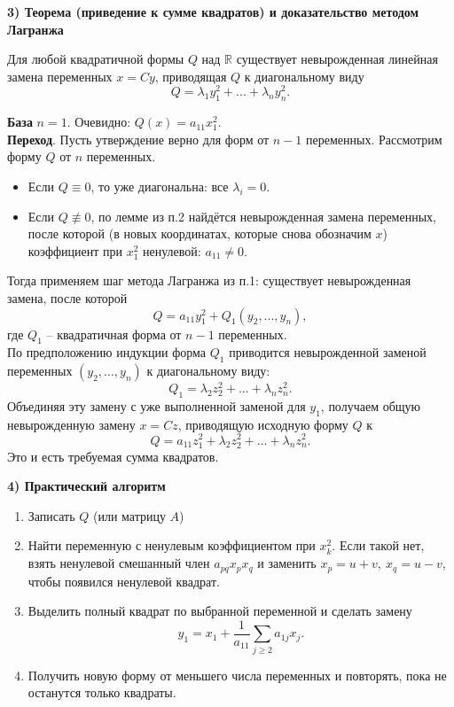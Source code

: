 \documentclass[14pt]{extreport}
\begin{document}
\begin{prbox}
        \textbf{3) Теорема (приведение к сумме квадратов) и доказательство методом Лагранжа}
        \begin{thbox}
            Для любой квадратичной формы $Q$ над $\mathbb{R}$ существует невырожденная линейная замена переменных $x=Cy$, приводящая $Q$ к диагональному виду
            \[
            Q = \lambda_1y_1^2 + ... + \lambda_ny_n^2.
            \]
        \end{thbox}
        \begin{prbox}
            \textbf{База} $n=1$. Очевидно: $Q(x) = a_{11}x_1^2$.\\
            \textbf{Переход}. Пусть утверждение верно для форм от $n-1$ переменных. Рассмотрим форму $Q$ от $n$ переменных.
            \begin{itemize}
                \item Если $Q \equiv 0$, то уже диагональна: все $\lambda_i = 0$.
                \item Если $Q \not\equiv 0$, по лемме из п.2 найдётся невырожденная замена переменных, после которой (в новых координатах, которые снова обозначим $x$) коэффициент при $x_1^2$ ненулевой: $a_{11} \neq 0$.
            \end{itemize}
            Тогда применяем шаг метода Лагранжа из п.1: существует невырожденная замена, после которой
            \[
            Q = a_{11}y_1^2 + Q_1(y_2,...,y_n),
            \]
            где $Q_1$ – квадратичная форма от $n-1$ переменных.\\
            По предположению индукции форма $Q_1$ приводится невырожденной заменой переменных $(y_2,...,y_n)$ к диагональному виду:
            \[
            Q_1 = \lambda_2z_2^2 + ... + \lambda_nz_n^2.
            \]
            Объединяя эту замену с уже выполненной заменой для $y_1$, получаем общую невырожденную замену $x = Cz$, приводящую исходную форму $Q$ к
            \[
            Q = a_{11}z_1^2 + \lambda_2z_2^2 + ... + \lambda_nz_n^2.
            \]
            Это и есть требуемая сумма квадратов.
        \end{prbox}

        \textbf{4) Практический алгоритм}
        \begin{enumerate}
            \item Записать $Q$ (или матрицу $A$)
            \item Найти переменную с ненулевым коэффициентом при $x_k^2$. Если такой нет, взять ненулевой смешанный член $a_{pq}x_px_q$ и заменить $x_p = u+v,\ x_q = u-v$, чтобы появился ненулевой квадрат.
            \item Выделить полный квадрат по выбранной переменной и сделать замену
            \[
            y_1 = x_1 + \frac{1}{a_{11}} \sum_{j \geq 2} a_{1j}x_j.
            \]
            \item Получить новую форму от меньшего числа переменных и повторять, пока не останутся только квадраты.
        \end{enumerate}
    \end{prbox}
\end{document}
